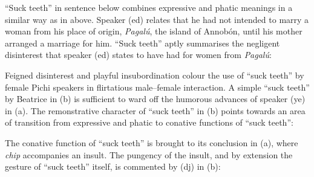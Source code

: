 “Suck teeth” in sentence  below combines expressive and phatic meanings in a similar way as in  above. Speaker (ed) relates that he had not intended to marry a woman from his place of origin, \textit{Pagalú}, the island of Annobón, until his mother arranged a marriage for him. “Suck teeth” aptly summarises the negligent disinterest that speaker (ed) states to have had for women from \textit{Pagalú}: 


\ea%
    \label{ex:key:1667}
\z\z

Feigned disinterest and playful insubordination colour the use of “suck teeth” by female Pichi speakers in flirtatious male–female interaction. A simple “suck teeth” by Beatrice in (b) is sufficient to ward off the humorous advances of speaker (ye) in (a). The remonstrative character of “suck teeth” in (b) points towards an area of transition from expressive and phatic to conative functions of “suck teeth”:


\ea%
    \label{ex:key:1668}
\z\z

The conative function of “suck teeth” is brought to its conclusion in (a), where\textit{ chip} accompanies an insult. The pungency of the insult, and by extension the gesture of “suck teeth” itself, is commented by (dj) in (b):


